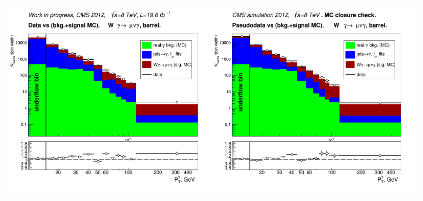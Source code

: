 
\begin{figure}[htb]
  \begin{center}
   \includegraphics[width=0.48\textwidth]{../figs/figs_v11/MUON_WGamma/PrepareYields/c_DATAvsBkgPlusSigMCc_MUON_WGamma_TEMPL_CHISO_UNblind__Barrel__phoEt.png}\includegraphics[width=0.48\textwidth]{../figs/figs_v11/MUON_WGamma/PrepareYields/c_DATAvsBkgPlusSigMCc_MUON_WGamma_TEMPL_CHISO_UNblind_MCclosure__Barrel__phoEt_MCclosure.png}\\

\end{center}
\end{figure}
